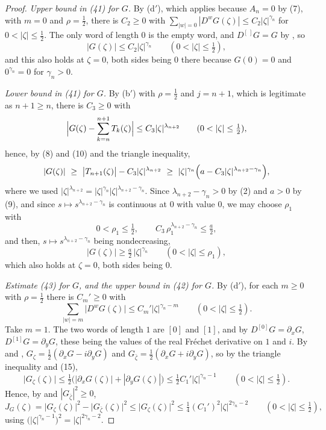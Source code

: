 \begin{proof}
\emph{Upper bound in (41) for $G$.}  By (d$'$), which applies because $A_n=0$
by (7), with $m=0$ and $\rho=\tfrac12$, there is $C_2\ge0$ with
$\sum_{|w|=0}|D^{w}G(\zeta)|\le C_2|\zeta|^{\gamma_n}$ for
$0<|\zeta|\le\tfrac12$.  The only word of length $0$ is the empty word, and
$D^{[\,]}G=G$ by , so
\begin{equation}\tag{12}
  |G(\zeta)|\le C_2|\zeta|^{\gamma_n}\qquad(0<|\zeta|\le\tfrac12),
\end{equation}
and this also holds at $\zeta=0$, both sides being $0$ there because $G(0)=0$
and $0^{\gamma_n}=0$ for $\gamma_n>0$.

\emph{Lower bound in (41) for $G$.}  By (b$'$) with $\rho=\tfrac12$ and
$j=n+1$, which is legitimate as $n+1\ge n$, there is $C_3\ge0$ with
\[
  \Bigl|G(\zeta)-\sum_{k=n}^{n+1}T_k(\zeta)\Bigr|\le C_3|\zeta|^{\lambda_{n+2}}
  \qquad(0<|\zeta|\le\tfrac12),
\]
hence, by (8) and (10) and the triangle inequality,
\[
  |G(\zeta)|\ \ge\ \bigl|T_{n+1}(\zeta)\bigr|-C_3|\zeta|^{\lambda_{n+2}}
  \ \ge\ |\zeta|^{\gamma_n}\Bigl(a-C_3|\zeta|^{\lambda_{n+2}-\gamma_n}\Bigr),
\]
where we used $|\zeta|^{\lambda_{n+2}}=|\zeta|^{\gamma_n}
|\zeta|^{\lambda_{n+2}-\gamma_n}$.  Since $\lambda_{n+2}-\gamma_n>0$ by (2) and
$a>0$ by (9), and since $s\mapsto s^{\lambda_{n+2}-\gamma_n}$ is continuous at
$0$ with value $0$, we may choose $\rho_1$ with
\begin{equation}\tag{13}
  0<\rho_1\le\tfrac12,\qquad C_3\,\rho_1^{\lambda_{n+2}-\gamma_n}\le\tfrac a2 ,
\end{equation}
and then, $s\mapsto s^{\lambda_{n+2}-\gamma_n}$ being nondecreasing,
\begin{equation}\tag{14}
  |G(\zeta)|\ge\tfrac a2\,|\zeta|^{\gamma_n}\qquad(0<|\zeta|\le\rho_1),
\end{equation}
which also holds at $\zeta=0$, both sides being $0$.

\emph{Estimate (43) for $G$, and the upper bound in (42) for $G$.}  By (d$'$),
for each $m\ge0$ with $\rho=\tfrac12$ there is $C_m'\ge0$ with
\begin{equation}\tag{15}
  \sum_{|w|=m}\bigl|D^{w}G(\zeta)\bigr|\le C_m'|\zeta|^{\gamma_n-m}
  \qquad(0<|\zeta|\le\tfrac12).
\end{equation}
Take $m=1$.  The two words of length $1$ are $[0]$ and $[1]$, and by
 $D^{[0]}G=\partial_xG$, $D^{[1]}G=\partial_yG$, these
being the values of the real Fréchet derivative on $1$ and $i$.  By
 and ,
$G_\zeta=\tfrac12(\partial_xG-i\partial_yG)$ and
$G_{\bar\zeta}=\tfrac12(\partial_xG+i\partial_yG)$, so by the triangle
inequality and (15),
\[
  \bigl|G_\zeta(\zeta)\bigr|\le\tfrac12\bigl(|\partial_xG(\zeta)|
    +|\partial_yG(\zeta)|\bigr)\le\tfrac12C_1'|\zeta|^{\gamma_n-1}
  \qquad(0<|\zeta|\le\tfrac12).
\]
Hence, by  and $|G_{\bar\zeta}|^2\ge0$,
\begin{equation}\tag{16}
  J_G(\zeta)=\bigl|G_\zeta(\zeta)\bigr|^2-\bigl|G_{\bar\zeta}(\zeta)\bigr|^2
  \le\bigl|G_\zeta(\zeta)\bigr|^2
  \le\tfrac14(C_1')^2|\zeta|^{2\gamma_n-2}\qquad(0<|\zeta|\le\tfrac12),
\end{equation}
using $\bigl(|\zeta|^{\gamma_n-1}\bigr)^2=|\zeta|^{2\gamma_n-2}$.


\end{proof}
